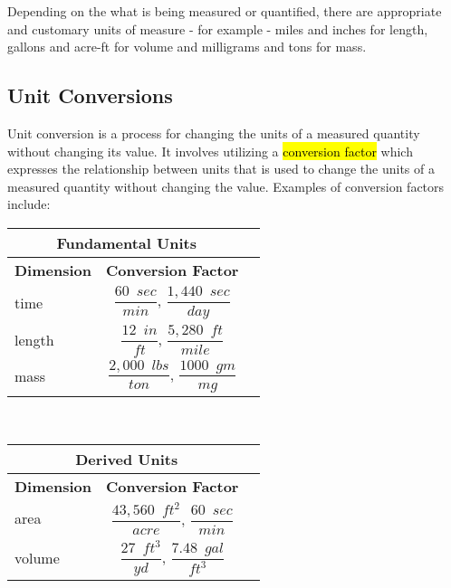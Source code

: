 Depending on the what is being measured or quantified, there are appropriate and customary units of measure - for example - miles and inches for length, gallons and acre-ft for volume and milligrams and tons for mass.
\subsection{Unit Conversions}
Unit conversion is a process for changing the units of a measured quantity without changing its value.  It involves 
utilizing a \hl{conversion factor} which expresses the relationship between units that is used to change the units of a measured quantity without changing the value. Examples of conversion factors include:\\

\begin{center}
\renewcommand{\arraystretch}{1.5}
\vspace{0.5cm}
\begin{tabular}{l| c c }
\hline
\multicolumn{2}{c}{\textbf{Fundamental Units}} \\
\hline
\textbf{Dimension} & \textbf{Conversion Factor}\\[0.5cm]

\hspace{0.3cm}
time & $\dfrac{60 \enspace sec}{min}$, $\dfrac{1,440\enspace sec}{day}$\\[0.5cm]
length & $\dfrac{12 \enspace in}{ft}$, $\dfrac{5,280 \enspace ft}{mile}$\\[0.5cm]
mass & $\dfrac{2,000 \enspace lbs}{ton}$, $\dfrac{1000 \enspace gm}{mg}$\\
\end{tabular}\\
\begin{tabular}{l| c c }
\hline
\multicolumn{2}{c}{\textbf{Derived Units}} \\
\hline
\textbf{Dimension} & \textbf{Conversion Factor}\\[0.5cm]

\hspace{0.3cm}
area & $\dfrac{43,560 \enspace ft^2}{acre}$, $\dfrac{60 \enspace sec}{min}$\\[0.5cm]
volume & $\dfrac{27 \enspace ft^3}{yd}$, $\dfrac{7.48 \enspace gal}{ft^3}$\\
\end{tabular}\\
\end{center}
\vspace{0.5cm}


